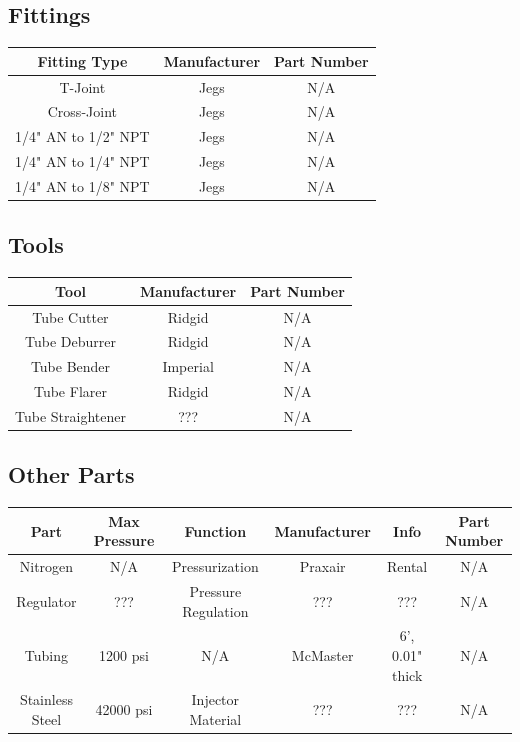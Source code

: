 \documentclass[9pt]{article} %
\numberwithin{equation}{section} %
\begin{document}
\subsection{Fittings}
\begin{center}
 \begin{tabular}{|c c c|} 
 \hline
 Fitting Type & Manufacturer & Part Number\\
 \hline\hline
 T-Joint & Jegs & N/A\\ 
 \hline
 Cross-Joint & Jegs & N/A\\
 \hline
 1/4" AN to 1/2" NPT & Jegs & N/A\\
 \hline
 1/4" AN to 1/4" NPT & Jegs & N/A\\ 
 \hline
 1/4" AN to 1/8" NPT & Jegs & N/A\\
 \hline
\end{tabular}
\end{center}

\subsection{Tools}

\begin{center}
 \begin{tabular}{|c c c|} 
 \hline
 Tool & Manufacturer & Part Number\\
 \hline\hline
 Tube Cutter & Ridgid & N/A\\ 
 \hline
 Tube Deburrer & Ridgid & N/A\\
 \hline
 Tube Bender & Imperial & N/A\\
 \hline
 Tube Flarer & Ridgid & N/A\\
 \hline
 Tube Straightener & ??? & N/A\\ [0.5ex]
 \hline
\end{tabular}
\end{center}

\subsection{Other Parts}
\begin{center}
 \begin{tabular}{|c c c c c c|} 
 \hline
 Part & Max Pressure & Function & Manufacturer & Info & Part Number\\
 \hline\hline
 Nitrogen & N/A & Pressurization & Praxair & Rental & N/A\\ 
 \hline
 Regulator & ??? & Pressure Regulation & ??? & ??? & N/A\\
 \hline
 Tubing & 1200 psi & N/A & McMaster & 6', 0.01" thick & N/A\\
 \hline
 Stainless Steel & 42000 psi & Injector Material & ??? & ??? & N/A\\ [0.5ex]
 \hline
\end{tabular}
\end{center}
\end{document}
